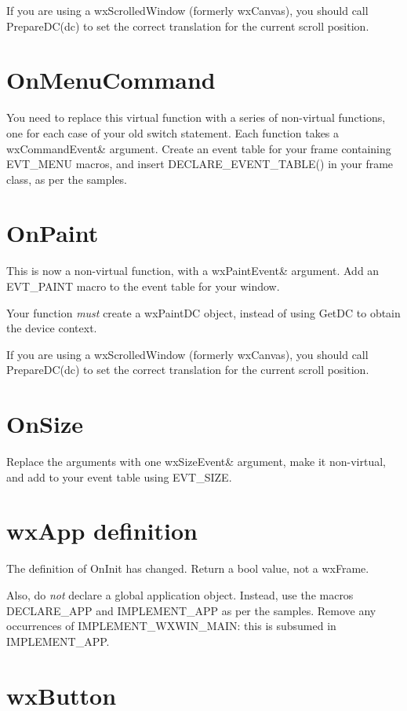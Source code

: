 If you are using a wxScrolledWindow (formerly wxCanvas), you should call
PrepareDC(dc) to set the correct translation for the current scroll position.

\section{OnMenuCommand}

You need to replace this virtual function with a series of non-virtual functions, one for
each case of your old switch statement. Each function takes a wxCommandEvent\& argument.
Create an event table for your frame
containing EVT\_MENU macros, and insert DECLARE\_EVENT\_TABLE() in your frame class, as
per the samples.

\section{OnPaint}

This is now a non-virtual function, with a wxPaintEvent\& argument.
Add an EVT\_PAINT macro to the event table
for your window.

Your function {\it must} create a wxPaintDC object, instead of using GetDC to
obtain the device context.

If you are using a wxScrolledWindow (formerly wxCanvas), you should call
PrepareDC(dc) to set the correct translation for the current scroll position.

\section{OnSize}

Replace the arguments with one wxSizeEvent\& argument, make it non-virtual, and add to your
event table using EVT\_SIZE.

\section{wxApp definition}

The definition of OnInit has changed. Return a bool value, not a wxFrame.

Also, do {\it not} declare a global application object. Instead, use the macros
DECLARE\_APP and IMPLEMENT\_APP as per the samples. Remove any occurrences of IMPLEMENT\_WXWIN\_MAIN:
this is subsumed in IMPLEMENT\_APP.

\section{wxButton}

